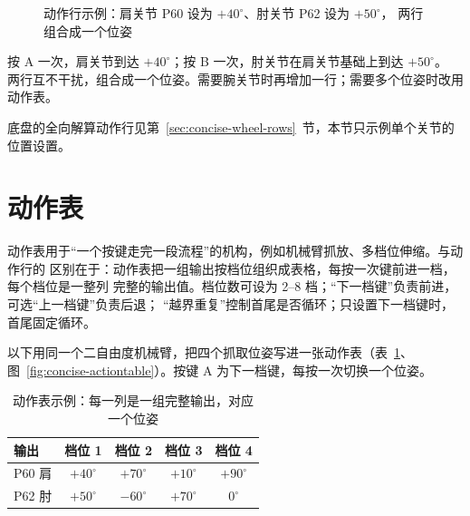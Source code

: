 \begin{figure}[htbp]
  \centering
  \caption{动作行示例：肩关节 P60 设为 $+40^\circ$、肘关节 P62 设为 $+50^\circ$，
  两行组合成一个位姿}
  \label{fig:concise-actionrow}
\end{figure}

按 A 一次，肩关节到达 $+40^\circ$；按 B 一次，肘关节在肩关节基础上到达 $+50^\circ$。
两行互不干扰，组合成一个位姿。需要腕关节时再增加一行；需要多个位姿时改用动作表。

底盘的全向解算动作行见第~\ref{sec:concise-wheel-rows}~节，本节只示例单个关节的位置设置。

\section{动作表}

动作表用于“一个按键走完一段流程”的机构，例如机械臂抓放、多档位伸缩。与动作行的
区别在于：动作表把一组输出按档位组织成表格，每按一次键前进一档，每个档位是一整列
完整的输出值。档位数可设为 2--8 档；“下一档键”负责前进，可选“上一档键”负责后退；
“越界重复”控制首尾是否循环；只设置下一档键时，首尾固定循环。

以下用同一个二自由度机械臂，把四个抓取位姿写进一张动作表（表~\ref{tab:concise-actiontable}、
图~\ref{fig:concise-actiontable}）。按键 A 为下一档键，每按一次切换一个位姿。

\begin{table}[htbp]
  \centering
  \small
  \begin{tabular}{@{}lcccc@{}}
    \toprule
    输出 & 档位 1 & 档位 2 & 档位 3 & 档位 4 \\
    \midrule
    P60 肩 & $+40^\circ$ & $+70^\circ$ & $+10^\circ$ & $+90^\circ$ \\
    P62 肘 & $+50^\circ$ & $-60^\circ$ & $+70^\circ$ & $0^\circ$ \\
    \bottomrule
  \end{tabular}
  \caption{动作表示例：每一列是一组完整输出，对应一个位姿}
  \label{tab:concise-actiontable}
\end{table}

